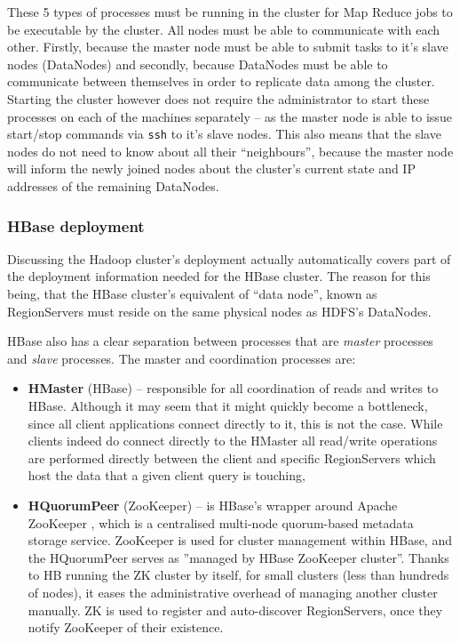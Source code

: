 These 5 types of processes must be running in the cluster for Map Reduce jobs to be executable by the cluster. All nodes must be able to communicate with each other. Firstly, because the master node must be able to submit tasks to it's slave nodes (DataNodes) and secondly, because DataNodes must be able to communicate between themselves in order to replicate data among the cluster. Starting the cluster however does not require the administrator to start these processes on each of the machines separately -- as the master node is able to issue start/stop commands via \verb|ssh| to it's slave nodes. This also means that the slave nodes do not need to know about all their ``neighbours'', because the master node will inform the newly joined nodes about the cluster's current state and IP addresses of the remaining DataNodes.


\subsubsection{HBase deployment}
\label{sec:hbase-deployment}
Discussing the Hadoop cluster's deployment actually automatically covers part of the deployment information needed for the HBase cluster. The reason for this being, that the HBase cluster's equivalent of ``data node'', known as RegionServers must reside on the same physical nodes as HDFS's DataNodes.

HBase also has a clear separation between processes that are \textit{master} processes and \textit{slave} processes.
The master and coordination processes are:

\begin{itemize}
\item \textbf{HMaster} (HBase) -- responsible for all coordination of reads and writes to HBase. Although it may seem 
                                  that it might quickly become a bottleneck, since all client applications connect 
                                  directly to it, this is not the case. While clients indeed do connect directly to the 
                                  HMaster all read/write operations are performed directly between the client and             
                                  specific RegionServers which host the data that a given client query is touching,
\item \textbf{HQuorumPeer} (ZooKeeper) -- is HBase's wrapper around Apache ZooKeeper \cite{zoo-keeper}, which is a
                                          centralised multi-node quorum-based metadata storage service. ZooKeeper is used 
                                          for cluster management within HBase, and the HQuorumPeer serves as ''managed by
                                          HBase ZooKeeper cluster''. Thanks to HB running the ZK cluster by itself, for 
                                          small clusters (less than hundreds of nodes), it eases the administrative 
                                          overhead of managing another cluster manually. ZK is used to register and 
                                          auto-discover RegionServers, once they notify ZooKeeper of their existence.
\end{itemize}

